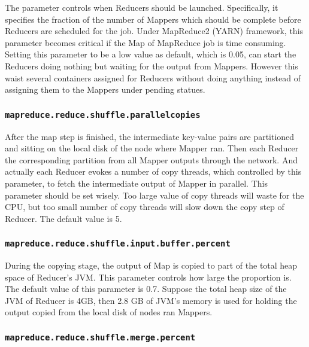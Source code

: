 The parameter controls when Reducers should be launched. Specifically, it specifies
the fraction of the number of Mappers which should be complete before Reducers
are scheduled for the job. Under MapReduce2 (YARN) \cite{YARN} framework, this parameter
becomes critical if the Map of MapReduce job is time consuming. Setting this 
parameter to be a low value as default, which is 0.05, can start the Reducers
doing nothing but waiting for the output from Mappers. However this waist several
containers assigned for Reducers without doing anything instead of assigning them
to the Mappers under pending statues.   

\subsubsection{\texttt{mapreduce.reduce.shuffle.parallelcopies}}

After the map step is finished, the intermediate key-value pairs are partitioned
and sitting on the local disk of the node where Mapper ran. Then each Reducer 
the corresponding partition from all Mapper outputs through the network. And
actually each Reducer evokes a number of copy threads, which controlled by this
parameter, to fetch the intermediate output of Mapper in parallel. This parameter
should be set wisely. Too large value of copy threads will waste for the CPU,
but too small number of copy threads will slow down the copy step of Reducer.
The default value is 5.

\subsubsection{\texttt{mapreduce.reduce.shuffle.input.buffer.percent}}

During the copying stage, the output of Map is copied to part of the total heap 
space of Reducer's JVM. This parameter controls how large the proportion is.
The default value of this parameter is 0.7. Suppose the total heap size of the
JVM of Reducer is 4GB, then 2.8 GB of JVM's memory is used for holding the output
copied from the local disk of nodes ran Mappers.

\subsubsection{\texttt{mapreduce.reduce.shuffle.merge.percent}}

